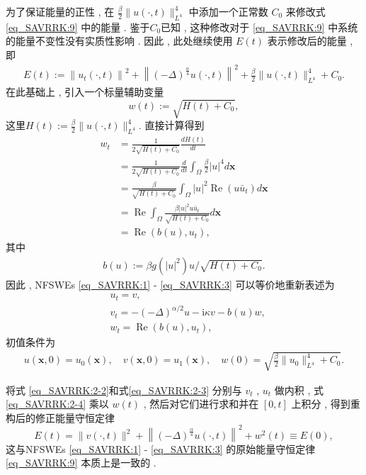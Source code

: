 为了保证能量的正性 , 在 $\frac{\beta}{2}\|u(\cdot , t)\|_{L^{4}}^{4}$ 中添加一个正常数 $C_0$ 来修改式 \eqref{eq_SAVRRK:9} 中的能量 . 
鉴于$C_0$已知 , 这种修改对于 \eqref{eq_SAVRRK:9} 中系统的能量不变性没有实质性影响 . 
因此 , 此处继续使用 $E(t)$ 表示修改后的能量 , 即
\begin{align}\label{eq_SAVRRK:9_1}
	E(t):=\left\|u_{t}(\cdot , t)\right\|^{2}+\left\|(-\Delta)^{\frac{\alpha}{4}} u(\cdot , t)\right\|^{2}+\frac{\beta}{2}\|u(\cdot , t)\|_{L^{4}}^{4} + C_0 . 
\end{align}
在此基础上 , 引入一个标量辅助变量
\begin{equation}
	w(t):=\sqrt{H(t)+C_0} , 
\end{equation}
这里$H(t):=\frac{\beta}{2}\|u(\cdot , t)\|_{L^{4}}^{4}  . $
直接计算得到
\begin{align}
	w_t & =\frac{1}{2 \sqrt{H(t)+C_0}} \frac{d H(t)}{d t} \nonumber\\
	& =\frac{1}{2 \sqrt{H(t)+C_0}} \frac{d}{d t} \int_{\Omega} \frac{\beta}{2}|u|^{4}d \boldsymbol{x} \nonumber\\
	& =\frac{\beta}{\sqrt{H(t)+C_0}} \int_{\Omega} |u|^2 \operatorname{Re}\left(u \bar{u}_t\right) d \boldsymbol{x}\nonumber\\
	& =\operatorname{Re} \int_{\Omega} \frac{\beta|u|^2 u \bar{u}_t}{\sqrt{H(t)+C_0}} d \boldsymbol{x} \nonumber\\
	& =\operatorname{Re}\left(b(u) , u_t\right) , \label{eq_SAVRRK:2-1}
\end{align}
其中
\begin{align}
b(u):=\beta g(|u|^2) u / \sqrt{H(t)+C_0} . 
\end{align}
因此 , NFSWEs \eqref{eq_SAVRRK:1} - \eqref{eq_SAVRRK:3} 可以等价地重新表述为
\begin{align}
& u_t=v , \label{eq_SAVRRK:2-2}\\
& v_t=-(-\Delta)^{\alpha / 2} u-\mathrm{i}\kappa v-b(u) w , \label{eq_SAVRRK:2-3}\\
& w_t=\operatorname{Re}\left(b(u) , u_t\right) , \label{eq_SAVRRK:2-4}
\end{align}
初值条件为
\begin{align}\label{eq_SAVRRK:31}
	u(\boldsymbol{x} , 0)=u_{0}(\boldsymbol{x}) , \quad v(\boldsymbol{x} , 0)=u_{1}(\boldsymbol{x}) , \quad w(0)=\sqrt{\frac{\beta}{2}\|u_{0}\|_{L^{4}}^{4} +C_0} . 
\end{align}

将式 \eqref{eq_SAVRRK:2-2}和式\eqref{eq_SAVRRK:2-3} 分别与 $v_t$  , $u_t$ 做内积 , 
式\eqref{eq_SAVRRK:2-4} 乘以 $w(t)$ , 然后对它们进行求和并在 $[0 , t]$ 上积分 , 得到重构后的修正能量守恒定律
\begin{equation}
E(t)=\|v(\cdot , t)\|^2+\left\|(-\Delta)^{\frac{\alpha}{4}} u(\cdot , t)\right\|^{2}+w^2(t) \equiv E(0) , 
\end{equation}
这与NFSWEs \eqref{eq_SAVRRK:1} - \eqref{eq_SAVRRK:3} 的原始能量守恒定律 \eqref{eq_SAVRRK:9} 本质上是一致的 . 

